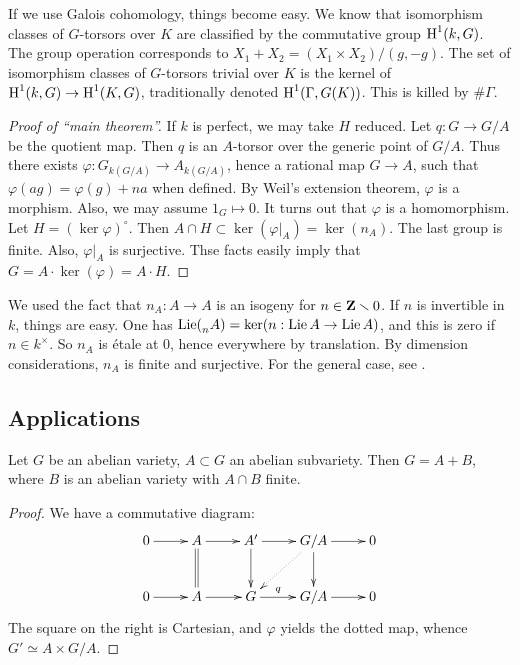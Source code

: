 If we use Galois cohomology, things become easy. We know that isomorphism 
classes of $G$-torsors over $K$ are classified by the commutative group 
$\operatorname{H}^1(k,G)$. The group operation corresponds to 
$X_1+X_2 = (X_1\times X_2)/(g,-g)$. The set of isomorphism classes of 
$G$-torsors trivial over $K$ is the kernel of 
$\operatorname{H}^1(k,G) \to \operatorname{H}^1(K,G)$, traditionally denoted $\operatorname{H}^1(\Gamma,G(K))$. This is 
killed by $\# \Gamma$. 

\begin{proof}[Proof of ``main theorem'']
If $k$ is perfect, we may take $H$ reduced. Let $q:G\to G/A$ be the quotient 
map. Then $q$ is an $A$-torsor over the generic point of $G/A$. Thus there 
exists $\varphi:G_{k(G/A)} \to A_{k(G/A)}$, hence a rational map 
$G\to A$, such that $\varphi(a g)=\varphi(g)+n a$ when defined. By Weil's 
extension theorem, $\varphi$ is a morphism. Also, we may assume $1_G \mapsto 0$. 
It turns out that $\varphi$ is a homomorphism. Let $H=(\ker\varphi)^\circ$. Then 
$A\cap H\subset \ker(\varphi|_A) = \ker(n_A)$. The last group is finite. 
Also, $\varphi|_A$ is surjective. Thse facts easily imply that 
$G=A\cdot \ker(\varphi) = A\cdot H$. 
\end{proof}

We used the fact that $n_A:A\to A$ is an isogeny for $n\in \mathbf{Z}\smallsetminus 0$. 
If $n$ is invertible in $k$, things are easy. One has 
$\operatorname{Lie}(\prescript{}{n}{A}) = \ker(n:\operatorname{Lie} A\to \operatorname{Lie} A)$, and this is zero if 
$n\in k^\times$. So $n_A$ is \'etale at $0$, hence everywhere by translation. 
By dimension considerations, $n_A$ is finite and surjective. For the general 
case, see \cite{m08}. 




\subsection{Applications}

\begin{coro}
Let $G$ be an abelian variety, $A\subset G$ an abelian subvariety. Then 
$G=A + B$, where $B$ is an abelian variety with $A\cap B$ finite. 
\end{coro}
\begin{proof}
We have a commutative diagram:
\[\xymatrix{
  0 \ar[r] 
    & A \ar[r] \ar@{=}[d] 
    & A' \ar[r] \ar[d] 
    & G/A \ar[r] \ar[d] \ar@{.>}[dl] 
    & 0 \\
  0 \ar[r] 
    & A \ar[r] 
    & G \ar[r]^-q 
    & G/A \ar[r] 
    & 0 
}\]
The square on the right is Cartesian, and $\varphi$ yields the dotted map, 
whence $G'\simeq A\times G/A$.   
\end{proof}

